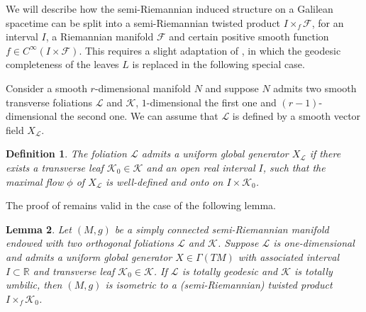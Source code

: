 \documentclass[12pt]{article}
\newtheorem{defi}{Definition}[section]
\newtheorem{lem}[defi]{Lemma}
\def\R{\mathbb R}
\def\f{\mathcal F}
\begin{document}
We will describe how the semi-Riemannian induced structure on a Galilean spacetime can be split into a semi-Riemannian twisted product $I\times_f \f$, for an interval $I$, a Riemannian manifold $\f$ and certain positive smooth function $f\in C^\infty(I\times \f)$. This requires a slight adaptation of \cite[Th. 1]{Ponge1993}, in which the geodesic completeness of the leaves $L$ is replaced in the following special case. 

Consider a smooth $r$-dimensional manifold $N$ and suppose $N$ admits two smooth transverse foliations $\mathcal{L}$ and $\mathcal{K}$, $1$-dimensional the first one and $(r-1)$-dimensional the second one. We can assume that $\mathcal{L}$ is defined by a smooth vector field $X_{\mathcal{L}}$.

\begin{defi} 
The foliation $\mathcal{L}$ admits a \emph{uniform global generator} $X_{\mathcal{L}}$ if there exists a transverse leaf $\mathcal{K}_0\in \mathcal{K}$ and an open real interval $I$, such that the maximal flow $\phi$ of $X_{\mathcal{L}}$ is well-defined and onto on $I\times \mathcal{K}_0$. 
\end{defi}

The proof of \cite[Th. 1]{Ponge1993} remains valid in the case of the following lemma.
\begin{lem}\label{lem:Ponge modified}
    Let $(M,g)$ be a simply connected semi-Riemannian manifold endowed with two orthogonal foliations $\mathcal{L}$ and $\mathcal{K}$. Suppose $\mathcal{L}$ is one-dimensional and admits a uniform global generator $X\in \Gamma(TM)$ with associated interval $I\subset \R$ and transverse leaf $\mathcal{K}_0\in \mathcal{K}$. If $\mathcal{L}$ is totally geodesic and $\mathcal{K}$ is totally umbilic, then $(M,g)$ is isometric to a (semi-Riemannian) twisted product $I \times_f \mathcal{K}_0$. 
\end{lem}
\end{document}
